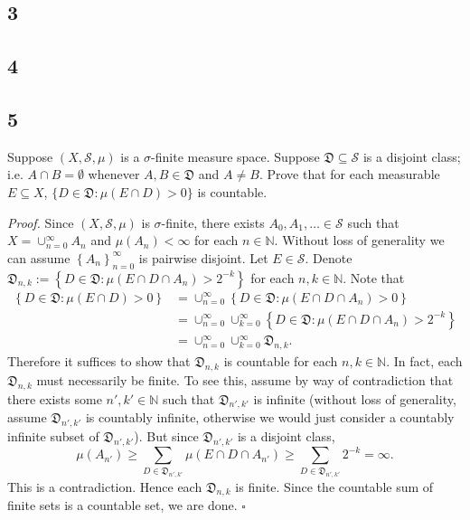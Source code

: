 \documentclass[12pt]{article}
\newcounter{ProofCounter}
\newenvironment{Proof}{\stepcounter{ProofCounter}\textit{Proof.}}{\hfill$\square$}
\begin{document}
\subsection*{3}



\subsection*{4}


\subsection*{5}
\begin{tcolorbox}
Suppose $(X, \mathcal{S}, \mu)$ is a $\sigma$-finite measure space. Suppose $\mathfrak{D} \subseteq \mathcal{S}$ is a disjoint class; i.e. $A\cap B = \emptyset$
whenever $A, B \in \mathfrak{D}$ and $A \neq B$. Prove that for each measurable $E \subseteq X$, $\{D \in \mathfrak{D} : \mu(E\cap D) > 0\}$ is
countable.
\end{tcolorbox}

\begin{Proof}
Since $(X, \mathcal{S}, \mu)$ is $\sigma$-finite, there exists $A_{0}, A_{1}, \hdots \in \mathcal{S}$ such that $X = \cup_{n=0}^{\infty}A_{n}$ and
$\mu(A_{n}) < \infty$ for each $n \in \mathbb{N}$. Without loss of generality we can assume $\left\{ A_{n} \right\}_{n=0}^{\infty}$ is pairwise
disjoint. Let $E \in \mathcal{S}$. Denote $\mathfrak{D}_{n,k} := \left\{ D \in \mathfrak{D} : \mu(E\cap D\cap A_{n}) > 2^{-k} \right\}$ for each $n,k
\in \mathbb{N}$. Note that 
\begin{align*}
\left\{ D \in \mathfrak{D} : \mu(E \cap D) > 0 \right\} & = \cup_{n=0}^{\infty}\left\{ D \in \mathfrak{D} : \mu(E\cap D\cap A_{n}) > 0 \right\} \\
& = \cup_{n=0}^{\infty}\cup_{k=0}^{\infty}\left\{ D \in \mathfrak{D} : \mu(E\cap D\cap A_{n}) > 2^{-k} \right\} \\
& = \cup_{n=0}^{\infty}\cup_{k=0}^{\infty}\mathfrak{D}_{n,k}.
\end{align*}
Therefore it suffices to show that $\mathfrak{D}_{n,k}$ is countable for each $n,k \in \mathbb{N}$. In fact, each $\mathfrak{D}_{n,k}$ must
necessarily be finite. To see this, assume by way of contradiction that there exists some $n', k' \in \mathbb{N}$ such that $\mathfrak{D}_{n',k'}$ is
infinite (without loss of generality, assume $\mathfrak{D}_{n',k'}$ is countably infinite, otherwise we would just consider a countably infinite
subset of $\mathfrak{D}_{n',k'}$). But since $\mathfrak{D}_{n',k'}$ is a disjoint class, 
\[ \mu(A_{n'}) \geq \sum_{D\in \mathfrak{D}_{n',k'}}\mu(E\cap D\cap A_{n'}) \geq \sum_{D\in\mathfrak{D}_{n',k'}}2^{-k} = \infty. \]
This is a contradiction. Hence each $\mathfrak{D}_{n,k}$ is finite. Since the countable sum of finite sets is a countable set, we are done.
\end{Proof}
\end{document}
